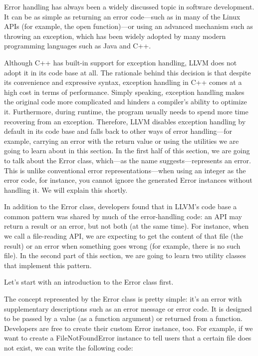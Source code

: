 
Error handling has always been a widely discussed topic in software development. It can be as simple as returning an error code—such as in many of the Linux APIs (for example, the open function)—or using an advanced mechanism such as throwing an exception, which has been widely adopted by many modern programming languages such as Java and C++.

Although C++ has built-in support for exception handling, LLVM does not adopt it in its code base at all. The rationale behind this decision is that despite its convenience and expressive syntax, exception handling in C++ comes at a high cost in terms of performance. Simply speaking, exception handling makes the original code more complicated and hinders a compiler's ability to optimize it. Furthermore, during runtime, the program usually needs to spend more time recovering from an exception. Therefore, LLVM disables exception handling by default in its code base and falls back to other ways of error handling—for example, carrying an error with the return value or using the utilities we are going to learn about in this section. In the first half of this section, we are going to talk about the Error class, which—as the name suggests—represents an error. This is unlike conventional error representations—when using an integer as the error code, for instance, you cannot ignore the generated Error instances without handling it. We will explain this shortly.

In addition to the Error class, developers found that in LLVM's code base a common pattern was shared by much of the error-handling code: an API may return a result or an error, but not both (at the same time). For instance, when we call a file-reading API, we are expecting to get the content of that file (the result) or an error when something goes wrong (for example, there is no such file). In the second part of this section, we are going to learn two utility classes that implement this pattern.

Let's start with an introduction to the Error class first.


The concept represented by the Error class is pretty simple: it's an error with supplementary descriptions such as an error message or error code. It is designed to be passed by a value (as a function argument) or returned from a function. Developers are free to create their custom Error instance, too. For example, if we want to create a FileNotFoundError instance to tell users that a certain file does not exist, we can write the following code:

